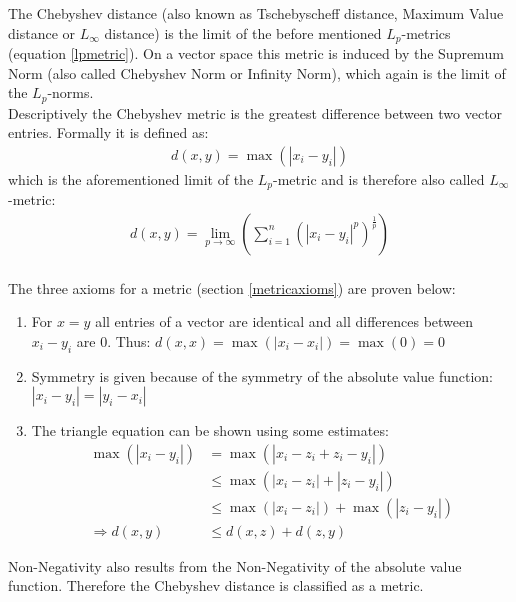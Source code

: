 The Chebyshev distance (also known as Tschebyscheff distance, Maximum Value distance or $L_\infty$ distance) is the limit of the before mentioned $L_p$-metrics (equation \ref{lpmetric}). On a vector space this metric is induced by the Supremum Norm (also called Chebyshev Norm or Infinity Norm), which again is the limit of the $L_p$-norms.\\
Descriptively the Chebyshev metric is the greatest difference between two vector entries. Formally it is defined as:
%
\begin{align}
    d(x, y) = \max (| x_i - y_i |)
\end{align}
%
which is the aforementioned limit of the $L_p$-metric and is therefore also called $L_\infty$-metric:
\begin{align}
    d(x, y) = \lim \limits_{p \to \infty} \left( \sum_{i=1}^{n}(|x_i-y_i|^p)^\frac{1}{p} \right)
\end{align}
\ \\
The three axioms for a metric (section \ref{metricaxioms}) are proven below:
\begin{enumerate}
    \item For $x = y$ all entries of a vector are identical and all differences between $x_i - y_i$ are $0$. Thus: $d(x,x) = \max (|x_i - x_i|) = \max (0) = 0$
    \item Symmetry is given because of the symmetry of the absolute value function: 
          $| x_i - y_i | = | y_i - x_i |$
    \item The triangle equation can be shown using some estimates:
    \begin{align*}
        \max(| x_i - y_i |) &= \max(|x_i - z_i + z_i - y_i|)\\
         &\leq \max(|x_i - z_i|+ |z_i - y_i|) \\
         &\leq \max(| x_i - z_i |) + \max(|z_i - y_i|)\\
        \Rightarrow d(x,y) &\leq d(x, z) + d(z, y)
    \end{align*}
\end{enumerate}
Non-Negativity also results from the Non-Negativity of the absolute value function. Therefore the Chebyshev distance is classified as a metric.

